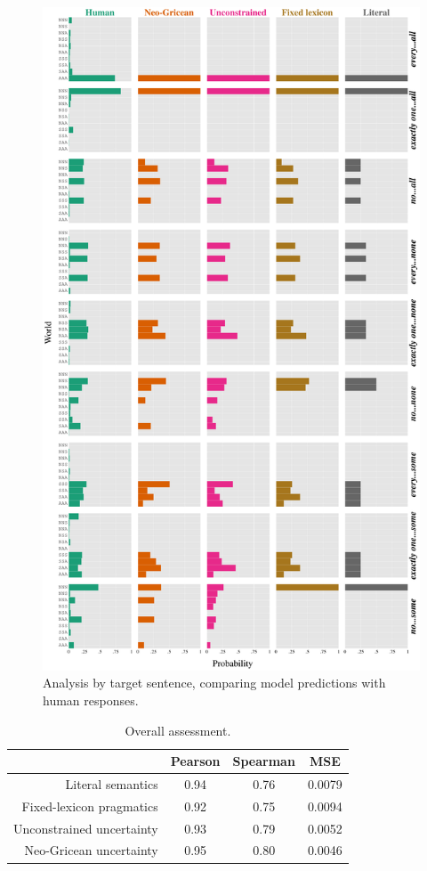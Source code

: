 \documentclass[leqno,12pt]{article}
\begin{document}
\begin{figure}[!h]
  \centering
  \includegraphics[height=0.92\textheight]{fig/allmodels}
  \caption{Analysis by target sentence, comparing model predictions
    with human responses.}
  \label{fig:exp-analysis}
\end{figure}

\begin{table}[th!]
  \centering
  \begin{tabular}[c]{r c c c}
    \toprule
    & Pearson & Spearman & MSE \\
    \midrule
    Literal semantics         & 0.94 & 0.76 & 0.0079\\
    Fixed-lexicon pragmatics  & 0.92 & 0.75 & 0.0094\\
    Unconstrained uncertainty & 0.93 & 0.79 & 0.0052\\
    Neo-Gricean uncertainty   & 0.95 & 0.80 & 0.0046\\
    \bottomrule   
  \end{tabular}
  \caption{Overall assessment.}
  \label{tab:overall}
\end{table}
\end{document}
